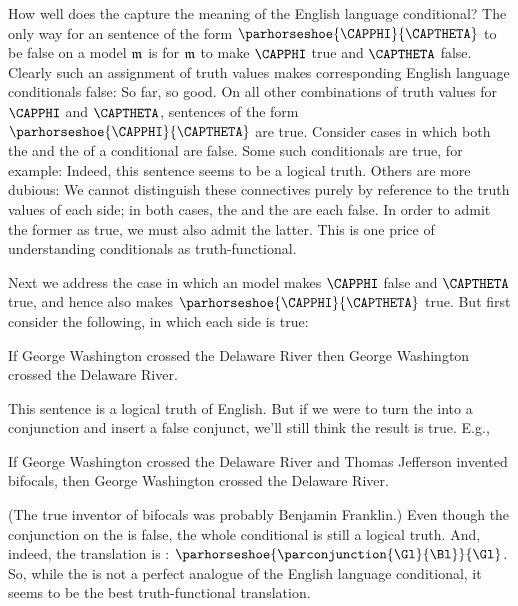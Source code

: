 How well does the \mention{$\HORSESHOE$} capture the meaning of the English language conditional?  The only way for an \GSL{} sentence of the form $\parhorseshoe{\CAPPHI}{\CAPTHETA}$ to be false on a model $\mathfrak{m}$ is for $\mathfrak{m}$ to make $\CAPPHI$ true and $\CAPTHETA$ false.  Clearly such an assignment of truth values makes corresponding English language conditionals false:   So far, so good.  On all other combinations of truth values for $\CAPPHI$ and $\CAPTHETA$, \GSL{} sentences of the form $\parhorseshoe{\CAPPHI}{\CAPTHETA}$ are true.  Consider cases in which both the  and the  of a conditional are false.  Some such conditionals are true, for example:   Indeed, this sentence seems to be a logical truth.  Others are more dubious:   We cannot distinguish these connectives purely by reference to the truth values of each side; in both cases, the  and the  are each false.  In order to admit the former as true, we must also admit the latter.  This is one price of understanding conditionals as truth-functional.

Next we address the case in which an \GSL{} model makes $\CAPPHI$ false and $\CAPTHETA$ true, and hence also makes $\parhorseshoe{\CAPPHI}{\CAPTHETA}$ true.  But first consider the following, in which each side is true:

\begin{menumerate}
	\item If George Washington crossed the Delaware River then George Washington crossed the Delaware River.
\end{menumerate}

\noindent{}This sentence is a logical truth of English.  But if we were to turn the  into a conjunction and insert a false conjunct, we'll still think the result is true.  E.g.,

\begin{menumerate}
	\item If George Washington crossed the Delaware River and Thomas Jefferson invented bifocals, then George Washington crossed the Delaware River.
\end{menumerate}

\noindent{}(The true inventor of bifocals was probably Benjamin Franklin.)  Even though the conjunction on the  is false, the whole conditional is still a logical truth.  And, indeed, the \GSL{} translation is : $\parhorseshoe{\parconjunction{\Gl}{\Bl}}{\Gl}$.  So, while the \mention{$\HORSESHOE$} is not a perfect analogue of the English language conditional, it seems to be the best truth-functional translation.

